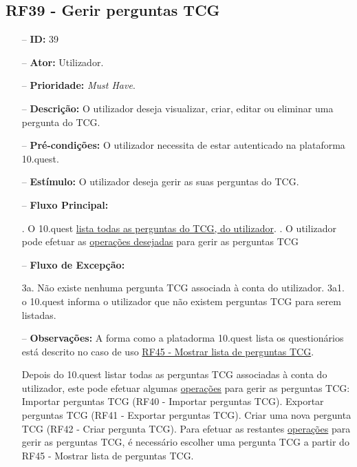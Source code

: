\subsection{RF39 - Gerir perguntas TCG}
\begin{itemize}
	\item[--] \textbf{ID:} 39
	\item[--]  \textbf{Ator:} Utilizador.
	\item[--]  \textbf{Prioridade:} \textit{Must Have}.
	\item[--]  \textbf{Descrição:} O utilizador deseja visualizar, criar, editar ou eliminar uma pergunta do TCG.
	\item[--]  \textbf{Pré-condições:} O utilizador necessita de estar autenticado na plataforma 10.quest.
	\item[--]  \textbf{Estímulo:} O utilizador deseja gerir as suas perguntas do TCG.
	\item[--]  \textbf{Fluxo Principal:} 
		\begin{comment}
		\subitem 1. O utilizador pressiona o botão Perguntas TCG.
		\subitem 2. O 10.quest efetua um pedido da lista de perguntas TCG ao TCG, associadas à conta do utilizador.
		\end{comment}
		. O 10.quest  \underline{lista todas as perguntas do TCG, do utilizador}.
		. O utilizador pode efetuar as \underline{operações desejadas} para gerir as perguntas TCG
	\item[--]  \textbf{Fluxo de Excepção:} 
		\begin{comment}
		\subitem 2a. O 10.quest não consegue efetuar o pedido à API do TCG devido a uma falha na conexão.
		\subitem 2a1. O 10.quest notifica o utilizador que ocorreu uma falha na conexão.
		\subitem 2b. O serviço do TCG (API) está indisponível.
		\subitem 2b1. O 10.quest notifica o utilizador que o serviço do TCG está temporariamente indisponível. 
		\end{comment}
		\subitem 3a. Não existe nenhuma pergunta TCG associada à conta do utilizador.
		\subitem 3a1. o 10.quest informa o utilizador que não existem perguntas TCG para serem listadas.
	\item[--]  \textbf{Observações:} A forma como a platadorma 10.quest lista os questionários está descrito no caso de uso \underline{RF45 - Mostrar lista de perguntas TCG}.
	
	Depois do 10.quest listar todas as perguntas TCG associadas à conta do utilizador, este pode efetuar algumas \underline{operações} para gerir as perguntas TCG:
		\subitem Importar perguntas TCG (RF40 - Importar perguntas TCG).
		\subitem Exportar perguntas TCG (RF41 - Exportar perguntas TCG).
		\subitem Criar uma nova pergunta TCG (RF42 - Criar pergunta TCG).
	Para efetuar as restantes \underline{operações}  para gerir as perguntas TCG, é necessário escolher uma pergunta TCG a partir do RF45 - Mostrar lista de perguntas TCG.
\end{itemize}
\newpage

